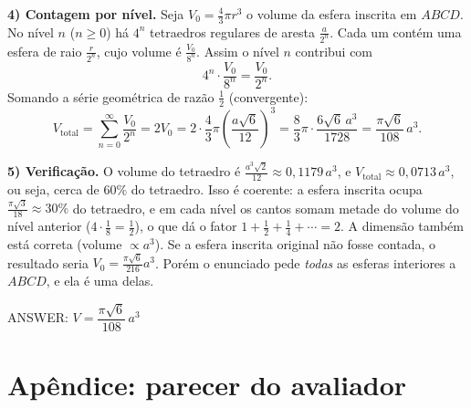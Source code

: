 \documentclass{article}%
\begin{document}
\textbf{4) Contagem por nível.} Seja $V_0=\frac43\pi r^3$ o volume da esfera inscrita em $ABCD$. No nível $n$ ($n\ge 0$) há $4^n$ tetraedros regulares de aresta $\frac{a}{2^n}$. Cada um contém uma esfera de raio $\frac{r}{2^n}$, cujo volume é $\frac{V_0}{8^n}$. Assim o nível $n$ contribui com
\[
4^n\cdot\frac{V_0}{8^n}=\frac{V_0}{2^n}.
\]
Somando a série geométrica de razão $\frac12$ (convergente):
\[
V_{\text{total}}=\sum_{n=0}^{\infty}\frac{V_0}{2^n}=2V_0
=2\cdot\frac43\pi\left(\frac{a\sqrt6}{12}\right)^3
=\frac83\pi\cdot\frac{6\sqrt6\,a^3}{1728}
=\frac{\pi\sqrt6}{108}\,a^3 .
\]

\textbf{5) Verificação.} O volume do tetraedro é $\frac{a^3\sqrt2}{12}\approx 0{,}1179\,a^3$, e $V_{\text{total}}\approx 0{,}0713\,a^3$, ou seja, cerca de $60\%$ do tetraedro. Isso é coerente: a esfera inscrita ocupa $\frac{\pi\sqrt3}{18}\approx 30\%$ do tetraedro, e em cada nível os cantos somam metade do volume do nível anterior ($4\cdot\frac18=\frac12$), o que dá o fator $1+\frac12+\frac14+\cdots=2$. A dimensão também está correta (volume $\propto a^3$). Se a esfera inscrita original não fosse contada, o resultado seria $V_0=\frac{\pi\sqrt6}{216}a^3$. Porém o enunciado pede \emph{todas} as esferas interiores a $ABCD$, e ela é uma delas.

\medskip
ANSWER: $V=\dfrac{\pi\sqrt6}{108}\,a^3$%
\newpage%
\section*{Apêndice: parecer do avaliador}%
\end{document}
